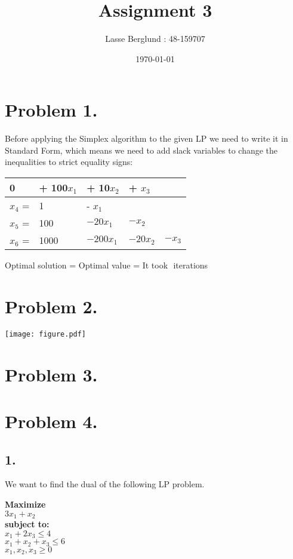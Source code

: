 \documentclass[12pt]{report}
\title{Assignment 3}
\author{Lasse Berglund : 48-159707}
\date{\today}
\begin{document}
\maketitle
\section*{Problem 1.}

Before applying the Simplex algorithm to the given LP we need to write it in Standard Form, which means we need to add slack variables to change the inequalities to strict equality signs:

\begin{tabular}{ l l l l l }
  0 & + 100$x_1$ & + 10$x_2$ & + $x_3$ \\  \hline

  $x_4$ = & 1 & - $x_1$ \\ 
  $x_5$ = & 100 & $-20x_1$ & $- x_2$ \\ 
  $x_6$ = & 1000 & $-200x_1$ & $-20x_2$ & $-x_3$ \\ 


\end{tabular}


Optimal solution = 
Optimal value = 
It took $ $ iterations


\section*{Problem 2.}

\texttt{[image: figure.pdf]}

\section*{Problem 3.}

\section*{Problem 4.}

\subsection*{1.}

We want to find the dual of the following LP problem.

\textbf{Maximize}\\
  $3x_1 + x_2$\\
\textbf{subject to:}\\
  $ x_1 + 2x_3 \le 4 $ \\
  $ x_1 + x_2 + x_3\le 6 $ \\
  $ x_1,x_2,x_3 \ge 0 $ \\
\end{document}
